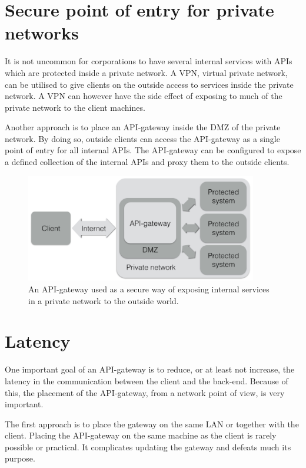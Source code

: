 \documentclass{cslthse-msc}
\begin{document}
\section{Secure point of entry for private networks}
It is not uncommon for corporations to have several internal services with APIs which are protected inside a private network. A VPN, virtual private network, can be utilised to give clients on the outside access to services inside the private network. A VPN can however have the side effect of exposing to much of the private network to the client machines.

Another approach is to place an API-gateway inside the DMZ of the private network. By doing so, outside clients can access the API-gateway as a single point of entry for all internal APIs. The API-gateway can be configured to expose a defined collection of the internal APIs and proxy them to the outside clients.

\begin{figure}[H]
  \centering
    \begin{center}
      \includegraphics[width=0.9\textwidth]{images/api_gateway_dmz.png}
    \end{center}
  \caption{An API-gateway used as a secure way of exposing internal services in a private network to the outside world.}
\end{figure}

\section{Latency}
One important goal of an API-gateway is to reduce, or at least not increase, the latency in the communication between the client and the back-end. Because of this, the placement of the API-gateway, from a network point of view, is very important. 

The first approach is to place the gateway on the same LAN or together with the client. Placing the API-gateway on the same machine as the client is rarely possible or practical. It complicates updating the gateway and defeats much its purpose. 
\end{document}
